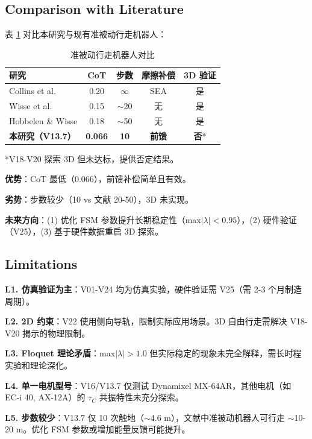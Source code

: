 \subsection{Comparison with Literature}

表 \ref{tab:comparison} 对比本研究与现有准被动行走机器人：

\begin{table}[h]
\centering
\caption{准被动行走机器人对比}
\label{tab:comparison}
\small
\begin{tabular}{@{}lcccc@{}}
\toprule
研究 & CoT & 步数 & 摩擦补偿 & 3D 验证 \\
\midrule
Collins et al. \cite{Collins2005} & 0.20 & $\infty$ & SEA & 是 \\
Wisse et al. \cite{Wisse2007} & 0.15 & $\sim$20 & 无 & 是 \\
Hobbelen \& Wisse \cite{Hobbelen2008} & 0.18 & $\sim$50 & 无 & 是 \\
\textbf{本研究（V13.7）} & \textbf{0.066} & \textbf{10} & \textbf{前馈} & \textbf{否}* \\
\bottomrule
\end{tabular}
\end{table}

*V18-V20 探索 3D 但未达标，提供否定结果。

\textbf{优势}：CoT 最低（0.066），前馈补偿简单且有效。

\textbf{劣势}：步数较少（10 vs 文献 20-50），3D 未实现。

\textbf{未来方向}：(1) 优化 FSM 参数提升长期稳定性（max$|\lambda| < 0.95$），(2) 硬件验证（V25），(3) 基于硬件数据重启 3D 探索。

\subsection{Limitations}

\textbf{L1. 仿真验证为主}：V01-V24 均为仿真实验，硬件验证需 V25（需 2-3 个月制造周期）。

\textbf{L2. 2D 约束}：V22 使用侧向导轨，限制实际应用场景。3D 自由行走需解决 V18-V20 揭示的物理限制。

\textbf{L3. Floquet 理论矛盾}：max$|\lambda| > 1.0$ 但实际稳定的现象未完全解释，需长时程实验和理论深化。

\textbf{L4. 单一电机型号}：V16/V13.7 仅测试 Dynamixel MX-64AR，其他电机（如 EC-i 40, AX-12A）的 $\tau_C$ 共振特性未充分探索。

\textbf{L5. 步数较少}：V13.7 仅 10 次触地（$\sim$4.6 m），文献中准被动机器人可行走 $\sim$10-20 m。优化 FSM 参数或增加能量反馈可能提升。
